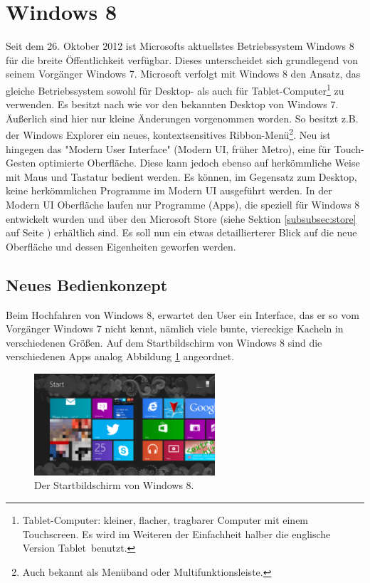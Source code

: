 \documentclass[12pt,a4paper,bibtotoc,abstracton]{scrartcl}
\begin{document}
\section{Windows 8}
\label{sec:windows8}
Seit dem 26. Oktober 2012 ist Microsofts aktuellstes Betriebssystem Windows 8 für die breite Öffentlichkeit verfügbar. Dieses unterscheidet sich grundlegend von seinem Vorgänger Windows 7. Microsoft verfolgt mit Windows 8 den Ansatz, das gleiche Betriebssystem sowohl für Desktop- als auch für Tablet-Computer\footnote{Tablet-Computer: kleiner, flacher, tragbarer Computer mit einem Touchscreen. Es wird im Weiteren der Einfachheit halber die englische Version \glqq Tablet\grqq\ benutzt.} zu verwenden. Es besitzt nach wie vor den bekannten Desktop von Windows 7. Äußerlich sind hier nur kleine Änderungen vorgenommen worden. So besitzt z.B. der Windows Explorer ein neues, kontextsensitives Ribbon-Menü\footnote{Auch bekannt als Menüband oder Multifunktionsleiste.}. Neu ist hingegen das "Modern User Interface" (Modern UI, früher Metro), eine für Touch-Gesten optimierte Oberfläche. Diese kann jedoch ebenso auf herkömmliche Weise mit Maus und Tastatur bedient werden. Es können, im Gegensatz zum Desktop, keine herkömmlichen Programme im Modern UI ausgeführt werden. In der Modern UI Oberfläche laufen nur Programme (Apps), die speziell für Windows 8 entwickelt wurden und über den Microsoft Store (siehe Sektion \ref{subsubsec:store} auf Seite \pageref{subsubsec:store}) erhältlich sind. Es soll nun ein etwas detaillierterer Blick auf die neue Oberfläche und dessen Eigenheiten geworfen werden.

\subsection{Neues Bedienkonzept}
\label{subsec:bedienkonzept}
Beim Hochfahren von Windows 8, erwartet den User ein Interface, das er so vom Vorgänger Windows 7 nicht kennt, nämlich viele bunte, viereckige Kacheln in verschiedenen Größen. Auf dem Startbildschirm von Windows 8 sind die verschiedenen Apps analog Abbildung \ref{fig:win8startscreen} angeordnet.

\begin{figure}[h]	
	\centering
	\includegraphics[width=0.6\textwidth]{Bilder/Screenshots/windows8/win8_startscreen.png} 
	\caption{Der Startbildschirm von Windows 8.}
	\label{fig:win8startscreen}
\end{figure}
\end{document}
